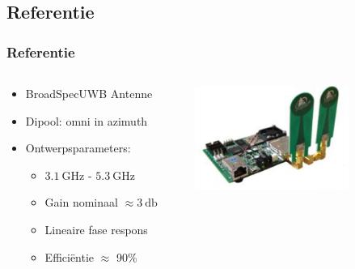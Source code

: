 \documentclass{beamer}
\begin{document}
\subsection{Referentie}
  \begin{frame}
  \frametitle{Referentie}
  \begin{columns}[c]
  \begin{column}{0.5\textwidth}
    \begin{itemize}
      \item BroadSpec\texttrademark  UWB Antenne 
      \item Dipool: omni in azimuth
      \item Ontwerpsparameters:
      \begin{itemize}
        \item $\SI{3.1}{\giga\hertz}$ - $\SI{5.3}{\giga\hertz}$
        \item Gain nominaal $\approx \SI{3}{\decibel}$ 
        \item Lineaire fase respons
        \item Effici\"entie $\approx$ 90\%
      \end{itemize}
    \end{itemize}
    \end{column}

    \begin{column}{0.5\textwidth}
    \centering
      \includegraphics[width=0.7\textwidth]{images/Pulson400UWB.jpg}
    \end{column}
    \end{columns}
  \end{frame}
\end{document}
